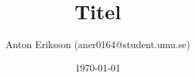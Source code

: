 \title{Titel}
\author{Anton Eriksson (aner0164@student.umu.se)}
\date{\today}

\begin{titlepage}
	\maketitle
	\thispagestyle{fancy} 
	\headheight 35pt
	\rhead{\today}
\end{titlepage}